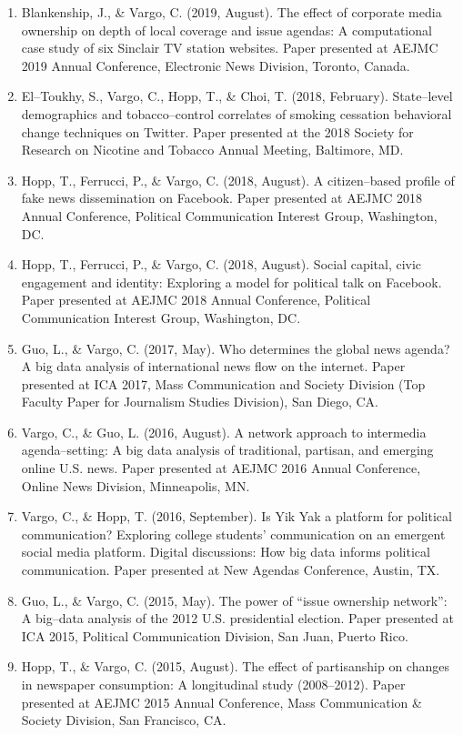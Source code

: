 \documentclass[11pt,letterpaper]{article}
\begin{document}
{\begin{enumerate}
\item Blankenship, J., \& Vargo, C. (2019, August). The effect of corporate media ownership on depth of local coverage and issue agendas: A computational case study of six Sinclair TV station websites. Paper presented at AEJMC 2019 Annual Conference, Electronic News Division, Toronto, Canada.
\item El--Toukhy, S., Vargo, C., Hopp, T., \& Choi, T. (2018, February). State--level demographics and tobacco--control correlates of smoking cessation behavioral change techniques on Twitter. Paper presented at the 2018 Society for Research on Nicotine and Tobacco Annual Meeting, Baltimore, MD.
\item Hopp, T., Ferrucci, P., \& Vargo, C. (2018, August). A citizen--based profile of fake news dissemination on Facebook. Paper presented at AEJMC 2018 Annual Conference, Political Communication Interest Group, Washington, DC.
\item Hopp, T., Ferrucci, P., \& Vargo, C. (2018, August). Social capital, civic engagement and identity: Exploring a model for political talk on Facebook. Paper presented at AEJMC 2018 Annual Conference, Political Communication Interest Group, Washington, DC.
\item Guo, L., \& Vargo, C. (2017, May). Who determines the global news agenda? A big data analysis of international news flow on the internet. Paper presented at ICA 2017, Mass Communication and Society Division (Top Faculty Paper for Journalism Studies Division), San Diego, CA.
\item Vargo, C., \& Guo, L. (2016, August). A network approach to intermedia agenda--setting: A big data analysis of traditional, partisan, and emerging online U.S. news. Paper presented at AEJMC 2016 Annual Conference, Online News Division, Minneapolis, MN.
\item Vargo, C., \& Hopp, T. (2016, September). Is Yik Yak a platform for political communication? Exploring college students' communication on an emergent social media platform. Digital discussions: How big data informs political communication. Paper presented at New Agendas Conference, Austin, TX.
\item Guo, L., \& Vargo, C. (2015, May). The power of ``issue ownership network'': A big--data analysis of the 2012 U.S. presidential election. Paper presented at ICA 2015, Political Communication Division, San Juan, Puerto Rico.
\item Hopp, T., \& Vargo, C. (2015, August). The effect of partisanship on changes in newspaper consumption: A longitudinal study (2008--2012). Paper presented at AEJMC 2015 Annual Conference, Mass Communication \& Society Division, San Francisco, CA.

\end{enumerate}}
\end{document}
